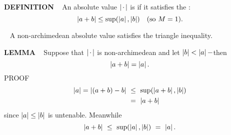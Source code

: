 \begin{x}{\small\bf DEFINITION} \ %
An absolute value $\left\vert\hspace{0.05cm} \cdot \hspace{0.05cm}\right\vert$  is 
if it satisfies the 
:
\[
\left\vert a + b\right\vert \le \sup(\left\vert a\right\vert,\left\vert b\right\vert)	\quad (\text{so } M = 1).
\]
\end{x}
\vspace{0.1cm}

\begin{x}{\small\bf {}} \ %
A non-archimedean absolute value satisfies the triangle inequality.
\end{x}
\vspace{0.1cm}

\begin{x}{\small\bf LEMMA} \ %
Suppose that $\left\vert\hspace{0.05cm} \cdot \hspace{0.05cm}\right\vert$  is non-archimedean and let $\left\vert b\right\vert < \left\vert a\right\vert -$then
\[
\left\vert a + b\right\vert = \left\vert a\right\vert.
\]
\quad PROOF \ 
\[
\begin{aligned}
\abs{a} = \abs{(a + b) - b} \ 
&\le \ \sup(\abs{a + b}, \abs{b}) \\
&=\  \abs{a + b}
\end{aligned}
\]
since $\left\vert a\right\vert \le \left\vert b\right\vert$ is untenable.  Meanwhile
\[
\left\vert a + b\right\vert \ \le \  \sup(\left\vert a\right\vert, \left\vert b\right\vert) \ = \  \left\vert a\right\vert.
\]
\end{x}
\vspace{0.1cm}


